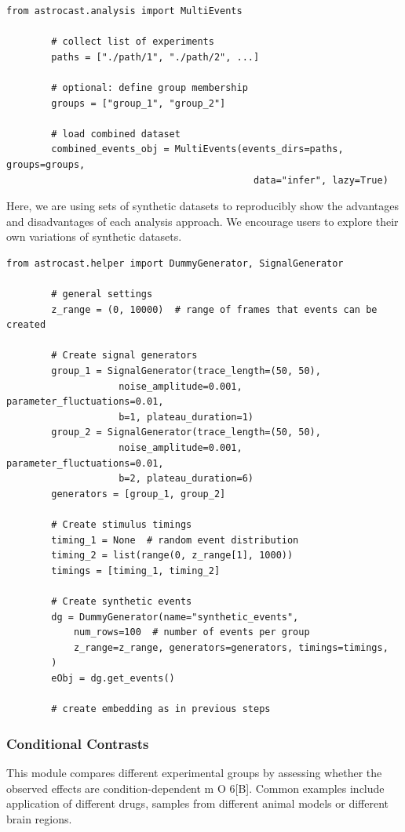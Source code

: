 \documentclass[utf8]{FrontiersinHarvard}
\newcommand{\fref}{ m O{} }{ (Figure~\ref{fig:#1}\IfValueT{#2}{\,#2})}
\begin{document}
    \begin{lstlisting}[style=pyStyle]
        from astrocast.analysis import MultiEvents

        # collect list of experiments
        paths = ["./path/1", "./path/2", ...]

        # optional: define group membership
        groups = ["group_1", "group_2"]

        # load combined dataset
        combined_events_obj = MultiEvents(events_dirs=paths, groups=groups,
                                            data="infer", lazy=True)
    \end{lstlisting}

    Here, we are using sets of synthetic datasets to reproducibly show the advantages and disadvantages of each analysis approach. We encourage users to explore their own variations of synthetic datasets.

    \begin{lstlisting}[style=pyStyle]
        from astrocast.helper import DummyGenerator, SignalGenerator

        # general settings
        z_range = (0, 10000)  # range of frames that events can be created

        # Create signal generators
        group_1 = SignalGenerator(trace_length=(50, 50),
                    noise_amplitude=0.001, parameter_fluctuations=0.01,
                    b=1, plateau_duration=1)
        group_2 = SignalGenerator(trace_length=(50, 50),
                    noise_amplitude=0.001, parameter_fluctuations=0.01,
                    b=2, plateau_duration=6)
        generators = [group_1, group_2]

        # Create stimulus timings
        timing_1 = None  # random event distribution
        timing_2 = list(range(0, z_range[1], 1000))
        timings = [timing_1, timing_2]

        # Create synthetic events
        dg = DummyGenerator(name="synthetic_events",
            num_rows=100  # number of events per group
            z_range=z_range, generators=generators, timings=timings,
        )
        eObj = dg.get_events()

        # create embedding as in previous steps
    \end{lstlisting}

    \subsubsection{Conditional Contrasts}
    This module compares different experimental groups by assessing whether the observed effects are condition-dependent\fref{6}[B]. Common examples include application of different drugs, samples from different animal models or different brain regions.
\end{document}
